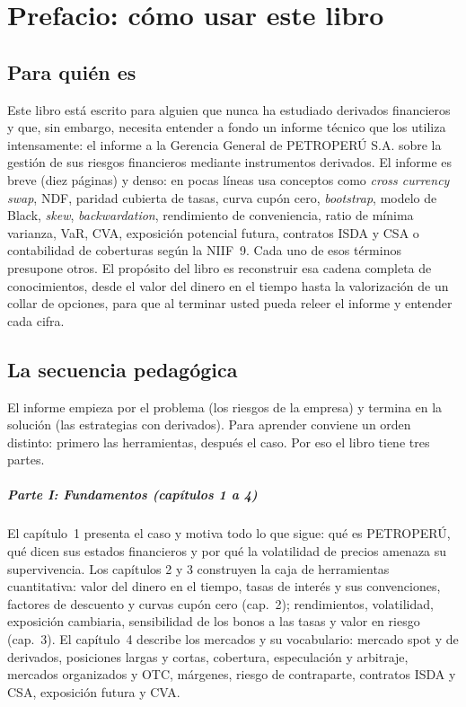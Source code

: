 \chapter{Prefacio: cómo usar este libro}

\section*{Para quién es}

Este libro está escrito para alguien que nunca ha estudiado derivados financieros y que, sin embargo, necesita entender a fondo un informe técnico que los utiliza intensamente: el informe a la Gerencia General de PETROPERÚ S.A. sobre la gestión de sus riesgos financieros mediante instrumentos derivados. El informe es breve (diez páginas) y denso: en pocas líneas usa conceptos como \emph{cross currency swap}, NDF, paridad cubierta de tasas, curva cupón cero, \emph{bootstrap}, modelo de Black, \emph{skew}, \emph{backwardation}, rendimiento de conveniencia, ratio de mínima varianza, VaR, CVA, exposición potencial futura, contratos ISDA y CSA o contabilidad de coberturas según la NIIF~9. Cada uno de esos términos presupone otros. El propósito del libro es reconstruir esa cadena completa de conocimientos, desde el valor del dinero en el tiempo hasta la valorización de un collar de opciones, para que al terminar usted pueda releer el informe y entender cada cifra.

\section*{La secuencia pedagógica}

El informe empieza por el problema (los riesgos de la empresa) y termina en la solución (las estrategias con derivados). Para aprender conviene un orden distinto: primero las herramientas, después el caso. Por eso el libro tiene tres partes.

\paragraph{Parte I: Fundamentos (capítulos 1 a 4)} El capítulo~1 presenta el caso y motiva todo lo que sigue: qué es PETROPERÚ, qué dicen sus estados financieros y por qué la volatilidad de precios amenaza su supervivencia. Los capítulos 2 y 3 construyen la caja de herramientas cuantitativa: valor del dinero en el tiempo, tasas de interés y sus convenciones, factores de descuento y curvas cupón cero (cap.~2); rendimientos, volatilidad, exposición cambiaria, sensibilidad de los bonos a las tasas y valor en riesgo (cap.~3). El capítulo~4 describe los mercados y su vocabulario: mercado spot y de derivados, posiciones largas y cortas, cobertura, especulación y arbitraje, mercados organizados y OTC, márgenes, riesgo de contraparte, contratos ISDA y CSA, exposición futura y CVA.

